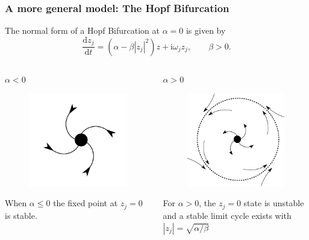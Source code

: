 \documentclass[10pt,reqno]{beamer}
\newcommand{\D}[2]{\frac{\mathrm{d} #1}{\mathrm{d} #2}}
\newcommand{\I}{\mathrm{i}}
\renewcommand{\mod}[1]{\left|#1\right|}
\begin{document}
\begin{frame}
\frametitle{A more general model: The Hopf Bifurcation}
The normal form of a Hopf Bifurcation at $\alpha = 0$ is given by
\[
\D{z_j}{t}= (\alpha - \beta\mod{z_j}^2)z + \I\omega_j z_j, \qquad \beta >0.
\]
\begin{columns}[t]
\begin{column}{.49\textwidth}
\centering
$\alpha <0$
\begin{figure}
\includegraphics[scale = 0.16]{node.png}
\end{figure}
When $\alpha \le 0$ the fixed point at $z_j =0$ is stable.
\end{column}
\begin{column}{.49\textwidth}
\centering
$\alpha >0$
\begin{figure}
\includegraphics[scale = 0.16]{hopf.png}
\end{figure}
For $\alpha>0$, the $z_j=0$ state is unstable and a stable limit cycle exists with $\mod{z_j} = \sqrt{\alpha/\beta}$				
\end{column}
\end{columns}
\end{frame}
\end{document}
